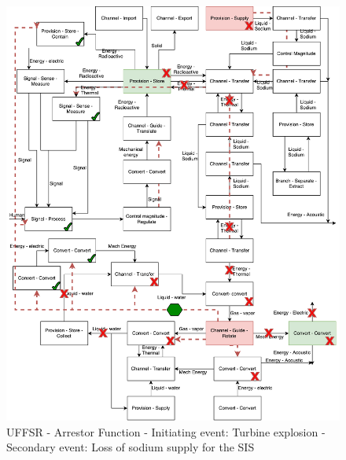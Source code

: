 \begin{figure}[t]
\centering
\includegraphics[scale=.55]{fig0e/UFFSR_2}
\caption{UFFSR - Arrestor Function - Initiating event: Turbine explosion - Secondary event: Loss of sodium supply for the SIS}
\label{fig:uffsr2}
\end{figure}


\
